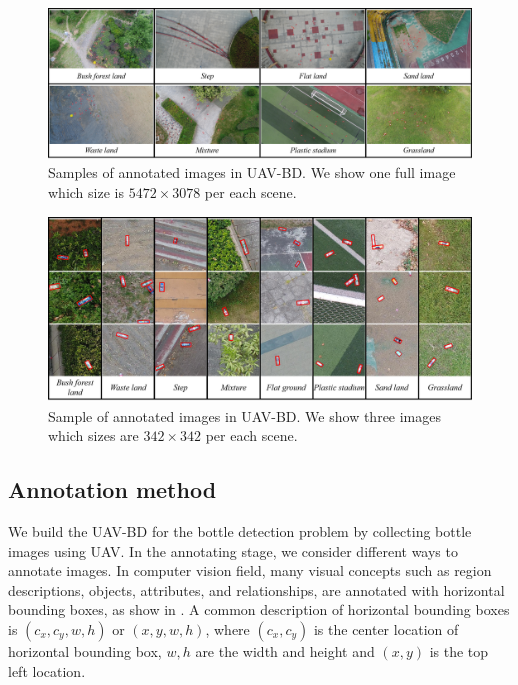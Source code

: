 \begin{figure}
	\includegraphics[width=\linewidth]{images/UAV-BD1.png}
	\caption{Samples of annotated images in UAV-BD. We show one full image which size is $ 5472\times 3078 $ per each scene.}
	\label{fig:dataset-original-image}
\end{figure}



\begin{figure}
	\includegraphics[width=\linewidth]{images/UAV-BD2.png}
	\caption{Sample of annotated images in UAV-BD. We show three images which sizes are $ 342\times 342 $ per each scene.}
	\label{fig:dataset-cut-image}
\end{figure}



\subsection{Annotation method}
\label{ssec:annotation_method}




We build the UAV-BD for the bottle detection problem by collecting bottle images using UAV. In the annotating stage, we consider different ways to annotate images. In computer vision field, many visual concepts such as region descriptions, objects, attributes, and relationships, are annotated with horizontal bounding boxes, as show in \cite{DOTA, boundingbox}. A common description of horizontal bounding boxes is $(c_x, c_y, w, h)$ or $ (x, y, w, h) $, where $(c_x, c_y)$ is the center location of horizontal bounding box, $w, h$ are the width and height and $ (x, y) $ is the top left location\cite{DOTA}. 

